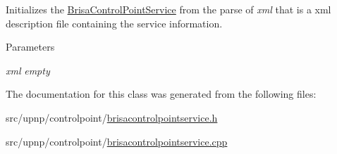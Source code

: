 Initializes the \hyperlink{classBrisaUpnp_1_1BrisaControlPointService}{BrisaControlPointService} from the parse of {\itshape xml\/} that is a xml description file containing the service information. 
\begin{DoxyParams}{Parameters}
\item[{\em xml}]{\itshape empty\/} \end{DoxyParams}


The documentation for this class was generated from the following files:\begin{DoxyCompactItemize}
\item 
src/upnp/controlpoint/\hyperlink{brisacontrolpointservice_8h}{brisacontrolpointservice.h}\item 
src/upnp/controlpoint/\hyperlink{brisacontrolpointservice_8cpp}{brisacontrolpointservice.cpp}\end{DoxyCompactItemize}
